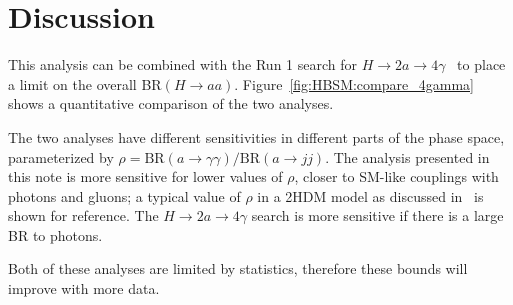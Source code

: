 \clearpage
\section{Discussion}
This analysis can be combined with the Run 1 search for $H\to 2a \to 4\gamma$~\cite{Aad:2015bua}
to place a limit on the overall BR$(H\rightarrow aa)$. 
Figure~\ref{fig:HBSM:compare_4gamma} shows a quantitative comparison of the two analyses.

The two analyses have different sensitivities in different parts of the phase space, 
parameterized by $\rho=\text{BR}(a\rightarrow \gamma\gamma)/\text{BR}(a\rightarrow jj)$. 
The analysis presented in this note is more sensitive for lower values of $\rho$, 
closer to SM-like couplings with photons and gluons; a typical value of $\rho$ in a 2HDM model as discussed in~\cite{Curtin:2013fra} is shown for reference.
The $H\to 2a \to 4\gamma$ search is more sensitive if there is a large BR to photons.
 
Both of these analyses are limited by statistics, 
therefore these bounds will improve with more data. 

